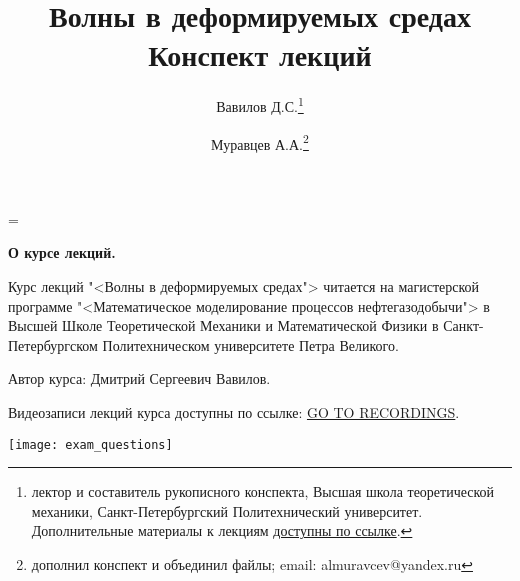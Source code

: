 \documentclass[a4paper,12pt]{article}
\newenvironment{nohyphen}
  {\tolerance=1
   \emergencystretch=\maxdimen
   \hyphenpenalty=10000
   \hbadness=10000}
  {\par}
\begin{document}
	
	\begin{nohyphen}
	
	\textbf{О курсе лекций.}
	
	Курс лекций "<Волны в деформируемых средах"> читается на магистерской программе "<Математическое моделирование процессов нефтегазодобычи"> в Высшей Школе Теоретической Механики и Математической Физики в Санкт-Петербургском Политехническом университете Петра Великого.
	
	Автор курса: Дмитрий Сергеевич Вавилов.
	
	Видеозаписи лекций курса доступны по ссылке: \href{https://csspbstu-my.sharepoint.com/:f:/g/personal/muravtsev_aa_edu_spbstu_ru/Epiacj6WFMBHqIF6E3YQgCMB7yi5NAA1ycqFLqrTZMhJ4w?e=i2agP0}{GO TO RECORDINGS}.
	
	\end{nohyphen}
	
	\tableofcontents
	\title{Волны в деформируемых средах\\Конспект лекций}
	\author{Вавилов Д.С.\thanks{лектор и составитель рукописного конспекта, Высшая школа теоретической механики, Санкт-Петербургский Политехнический университет. Дополнительные материалы к лекциям \href{https://csspbstu-my.sharepoint.com/:f:/g/personal/muravtsev_aa_edu_spbstu_ru/Epiacj6WFMBHqIF6E3YQgCMB7yi5NAA1ycqFLqrTZMhJ4w?e=i2agP0}{доступны по ссылке}.}
	\and
	Муравцев А.А.\thanks{дополнил конспект и объединил файлы; email: almuravcev@yandex.ru}}
	\maketitle
	\pagestyle{fancy}
	\begin{center}
	\texttt{[image: exam\_questions]}
	\end{center}
	\newpage
	
	\newpage
	
	\newpage
	
	\newpage
	
	\newpage
	
	\newpage
	
	\newpage
	
	\newpage
	
	\newpage
	
	\newpage
	
	\newpage
	
	\newpage
	
	\newpage
\end{document}
